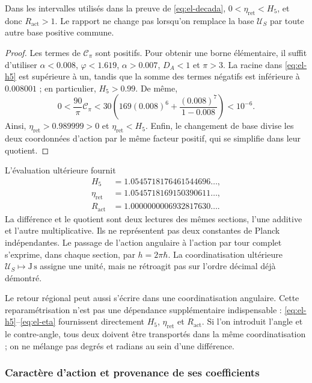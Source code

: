 \begin{proposition}\label{md:accion:positividad}
Dans les intervalles utilisés dans la preuve de \eqref{eq:el-decada},
\(0<\eta_{\mathrm{ret}}<H_5\), et donc
\(R_{\mathrm{act}}>1\). Le rapport ne change pas lorsqu’on remplace la base
\(\mathcal U_S\) par toute autre base positive commune.
\end{proposition}
\begin{proof}
Les termes de \(\mathcal C_\pi\) sont positifs. Pour obtenir une borne
élémentaire, il suffit d'utiliser \(\alpha<0.008\), \(\varphi<1.619\),
\(\alpha>0.007\), \(D_A<1\) et \(\pi>3\). La racine dans
\eqref{eq:el-h5} est supérieure à un, tandis que la somme des termes
négatifs est inférieure à \(0.008001\) ; en particulier, \(H_5>0.99\).
De même,
\[
 0<\frac{90}{\pi}\mathcal C_\pi
 <30\left(169(0.008)^6+
           \frac{(0.008)^7}{1-0.008}\right)<10^{-6}.
\]
Ainsi, \(\eta_{\mathrm{ret}}>0.989999>0\) et
\(\eta_{\mathrm{ret}}<H_5\). Enfin, le changement de base divise
les deux coordonnées d'action par le même facteur positif, qui se simplifie dans
leur quotient.
\end{proof}

L'évaluation ultérieure fournit
\begin{align*}
 H_5&=1.0545718176461544696\ldots,\\
 \eta_{\mathrm{ret}}&=1.0545718169150390611\ldots,\\
 R_{\mathrm{act}}&=1.0000000006932817630\ldots.
\end{align*}
La différence et le quotient sont deux lectures des mêmes sections,
l'une additive et l'autre multiplicative. Ils ne représentent pas deux constantes de
Planck indépendantes. Le passage de l'action angulaire à l'action par tour
complet s'exprime, dans chaque section, par
\(h=2\pi\hbar\). La coordinatisation ultérieure
\(\mathcal U_S\mapsto\mathrm{J\,s}\) assigne une unité, mais ne
rétroagit pas sur l'ordre décimal déjà démontré.

Le retour régional peut aussi s'écrire dans une coordinatisation angulaire.
Cette reparamétrisation n'est pas une dépendance supplémentaire indispensable :
\eqref{eq:el-h5}--\eqref{eq:el-eta} fournissent directement
\(H_5\), \(\eta_{\mathrm{ret}}\) et \(R_{\mathrm{act}}\). Si l'on
introduit l'angle et le contre-angle, tous deux doivent être transportés dans la même
coordinatisation ; on ne mélange pas degrés et radians au sein d'une différence.

\subsubsection{Caractère d'action et provenance de ses coefficients}
\label{sec:revision-planck}

